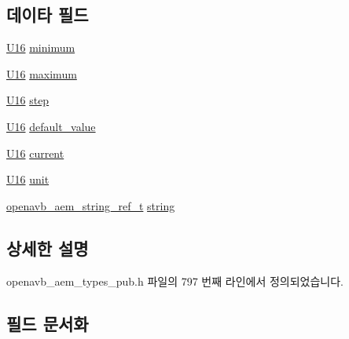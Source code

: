 \subsection*{데이타 필드}
\begin{DoxyCompactItemize}
\item 
\hyperlink{openavb__types__base__pub_8h_a0a0a322d5fa4a546d293a77ba8b4a71f}{U16} \hyperlink{structopenavb__aem__control__value__format__control__linear__uint16__t_aae8aae296f56fcafe53a566cdff7e35b}{minimum}
\item 
\hyperlink{openavb__types__base__pub_8h_a0a0a322d5fa4a546d293a77ba8b4a71f}{U16} \hyperlink{structopenavb__aem__control__value__format__control__linear__uint16__t_af77b6503d3091a6f332013d884385961}{maximum}
\item 
\hyperlink{openavb__types__base__pub_8h_a0a0a322d5fa4a546d293a77ba8b4a71f}{U16} \hyperlink{structopenavb__aem__control__value__format__control__linear__uint16__t_af7c6fffd5c0672714429d829fca32be1}{step}
\item 
\hyperlink{openavb__types__base__pub_8h_a0a0a322d5fa4a546d293a77ba8b4a71f}{U16} \hyperlink{structopenavb__aem__control__value__format__control__linear__uint16__t_aac9ffeb21c757efa1d5d7131973bb140}{default\+\_\+value}
\item 
\hyperlink{openavb__types__base__pub_8h_a0a0a322d5fa4a546d293a77ba8b4a71f}{U16} \hyperlink{structopenavb__aem__control__value__format__control__linear__uint16__t_aa86c0a1fbe18aa40441716503858192a}{current}
\item 
\hyperlink{openavb__types__base__pub_8h_a0a0a322d5fa4a546d293a77ba8b4a71f}{U16} \hyperlink{structopenavb__aem__control__value__format__control__linear__uint16__t_a0b3ff376c10369016824076deacc055e}{unit}
\item 
\hyperlink{structopenavb__aem__string__ref__t}{openavb\+\_\+aem\+\_\+string\+\_\+ref\+\_\+t} \hyperlink{structopenavb__aem__control__value__format__control__linear__uint16__t_a1f81001cefa769cb3651172fd5ab0748}{string}
\end{DoxyCompactItemize}


\subsection{상세한 설명}


openavb\+\_\+aem\+\_\+types\+\_\+pub.\+h 파일의 797 번째 라인에서 정의되었습니다.



\subsection{필드 문서화}
